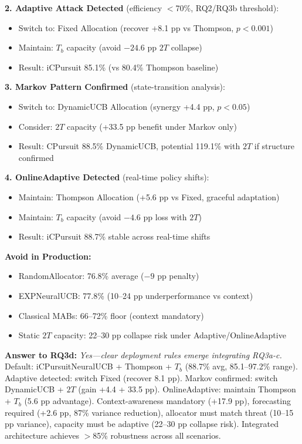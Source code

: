 \noindent\textbf{2. Adaptive Attack Detected} (efficiency $<$70\%, RQ2/RQ3b threshold):
\begin{itemize}[nosep]
\item Switch to: Fixed Allocation (recover +8.1 pp vs Thompson, $p<0.001$)
\item Maintain: $T_b$ capacity (avoid $-24.6$ pp $2T$ collapse)
\item Result: iCPursuit 85.1\% (vs 80.4\% Thompson baseline)
\end{itemize}

\noindent\textbf{3. Markov Pattern Confirmed} (state-transition analysis):
\begin{itemize}[nosep]
\item Switch to: DynamicUCB Allocation (synergy +4.4 pp, $p<0.05$)
\item Consider: $2T$ capacity (+33.5 pp benefit under Markov only)
\item Result: CPursuit 88.5\% DynamicUCB, potential 119.1\% with $2T$ if structure confirmed
\end{itemize}

\noindent\textbf{4. OnlineAdaptive Detected} (real-time policy shifts):
\begin{itemize}[nosep]
\item Maintain: Thompson Allocation (+5.6 pp vs Fixed, graceful adaptation)
\item Maintain: $T_b$ capacity (avoid $-4.6$ pp loss with $2T$)
\item Result: iCPursuit 88.7\% stable across real-time shifts
\end{itemize}

\noindent\textbf{Avoid in Production:}
\begin{itemize}[nosep]
\item RandomAllocator: 76.8\% average ($-9$ pp penalty)
\item EXPNeuralUCB: 77.8\% (10--24 pp underperformance vs context)
\item Classical MABs: 66--72\% floor (context mandatory)
\item Static $2T$ capacity: 22--30 pp collapse risk under Adaptive/OnlineAdaptive
\end{itemize}

\noindent\textbf{Answer to RQ3d:} \textit{Yes—clear deployment rules emerge integrating RQ3a-c.} Default: iCPursuitNeuralUCB + Thompson + $T_b$ (88.7\% avg, 85.1--97.2\% range). Adaptive detected: switch Fixed (recover 8.1 pp). Markov confirmed: switch DynamicUCB + $2T$ (gain +4.4 + 33.5 pp). OnlineAdaptive: maintain Thompson + $T_b$ (5.6 pp advantage). Context-awareness mandatory (+17.9 pp), forecasting required (+2.6 pp, 87\% variance reduction), allocator must match threat (10--15 pp variance), capacity must be adaptive (22--30 pp collapse risk). Integrated architecture achieves $>$85\% robustness across all scenarios.

